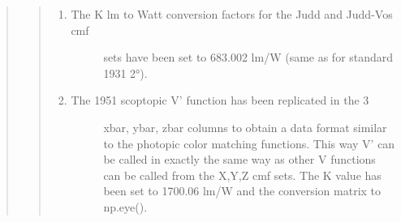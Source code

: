 \documentclass[letterpaper,10pt,english]{sphinxmanual}
\begin{document}
\begin{quote}
\begin{quote}
\begin{description}
\begin{enumerate}
\begin{description}
\end{description}

\item {} \begin{description}
\item[{The K lm to Watt conversion factors for the Judd and Judd-Vos cmf }] \leavevmode
sets have been set to 683.002 lm/W (same as for standard 1931 2°).

\end{description}

\item {} \begin{description}
\item[{The 1951 scoptopic V’ function has been replicated in the 3 }] \leavevmode
xbar, ybar, zbar columns to obtain a data format similar to the 
photopic color matching functions. 
This way V’ can be called in exactly the same way as other V 
functions can be called from the X,Y,Z cmf sets. 
The K value has been set to 1700.06 lm/W and the conversion matrix 
to np.eye().

\end{description}

\end{enumerate}

\end{description}\end{quote}
\end{quote}
\end{document}
